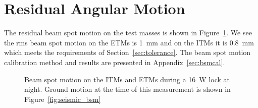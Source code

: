 \section{Residual Angular Motion}
The residual beam spot motion on the test masses is shown in
Figure~\ref{fig:bsm}. We see the rms beam spot motion on the ETMs is
1~mm and on the ITMs it is 0.8~mm which meets the requirements of
Section~\ref{sec:tolerance}. The beam spot motion calibration method
and results are presented in Appendix~\ref{sec:bsmcal}.

\begin{figure}
\begin{centering}
\caption[Beam spot motion on the ITMs and ETMs during a 16~W
lock]{Beam spot motion on the ITMs and ETMs during a 16~W lock at
  night. Ground motion at the time of this measurement is shown in
  Figure~\ref{fig:seismic_bsm}}%
\label{fig:bsm}
\end{centering}
\end{figure}


